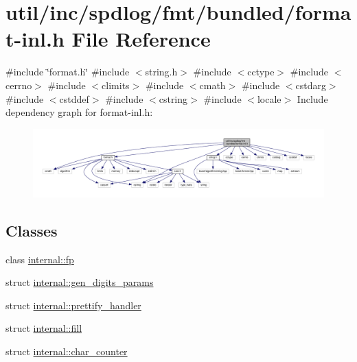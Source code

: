 \hypertarget{format-inl_8h}{}\section{util/inc/spdlog/fmt/bundled/format-\/inl.h File Reference}
\label{format-inl_8h}
{\ttfamily \#include \char`\"{}format.\+h\char`\"{}}\newline
{\ttfamily \#include $<$string.\+h$>$}\newline
{\ttfamily \#include $<$cctype$>$}\newline
{\ttfamily \#include $<$cerrno$>$}\newline
{\ttfamily \#include $<$climits$>$}\newline
{\ttfamily \#include $<$cmath$>$}\newline
{\ttfamily \#include $<$cstdarg$>$}\newline
{\ttfamily \#include $<$cstddef$>$}\newline
{\ttfamily \#include $<$cstring$>$}\newline
{\ttfamily \#include $<$locale$>$}\newline
Include dependency graph for format-\/inl.h\+:
\nopagebreak
\begin{figure}[H]
\begin{center}
\leavevmode
\includegraphics[width=350pt]{format-inl_8h__incl}
\end{center}
\end{figure}
\subsection*{Classes}
\begin{DoxyCompactItemize}
\item 
class \hyperlink{classinternal_1_1fp}{internal\+::fp}
\item 
struct \hyperlink{structinternal_1_1gen__digits__params}{internal\+::gen\+\_\+digits\+\_\+params}
\item 
struct \hyperlink{structinternal_1_1prettify__handler}{internal\+::prettify\+\_\+handler}
\item 
struct \hyperlink{structinternal_1_1fill}{internal\+::fill}
\item 
struct \hyperlink{structinternal_1_1char__counter}{internal\+::char\+\_\+counter}
\end{DoxyCompactItemize}
